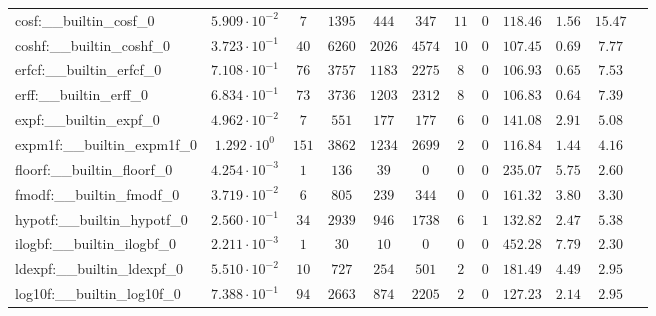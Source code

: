 \begin{tabular}{|l|c|c|c|c|c|c|c|c|c|c|c|}
cosf:\_\_builtin\_cosf\_0                 & $ 5.909 \cdot 10^{-2} $ & $ 7      $ & $ 1395   $ & $ 444   $ & $ 347   $ & $ 11  $ & $ 0 $ & $ 118.46      $ & $ 1.56    $ & $ 15.47   $ \\
coshf:\_\_builtin\_coshf\_0               & $ 3.723 \cdot 10^{-1} $ & $ 40     $ & $ 6260   $ & $ 2026  $ & $ 4574  $ & $ 10  $ & $ 0 $ & $ 107.45      $ & $ 0.69    $ & $ 7.77    $ \\
erfcf:\_\_builtin\_erfcf\_0               & $ 7.108 \cdot 10^{-1} $ & $ 76     $ & $ 3757   $ & $ 1183  $ & $ 2275  $ & $ 8   $ & $ 0 $ & $ 106.93      $ & $ 0.65    $ & $ 7.53    $ \\
erff:\_\_builtin\_erff\_0                 & $ 6.834 \cdot 10^{-1} $ & $ 73     $ & $ 3736   $ & $ 1203  $ & $ 2312  $ & $ 8   $ & $ 0 $ & $ 106.83      $ & $ 0.64    $ & $ 7.39    $ \\
expf:\_\_builtin\_expf\_0                 & $ 4.962 \cdot 10^{-2} $ & $ 7      $ & $ 551    $ & $ 177   $ & $ 177   $ & $ 6   $ & $ 0 $ & $ 141.08      $ & $ 2.91    $ & $ 5.08    $ \\
expm1f:\_\_builtin\_expm1f\_0             & $ 1.292 \cdot 10^{0}  $ & $ 151    $ & $ 3862   $ & $ 1234  $ & $ 2699  $ & $ 2   $ & $ 0 $ & $ 116.84      $ & $ 1.44    $ & $ 4.16    $ \\
floorf:\_\_builtin\_floorf\_0             & $ 4.254 \cdot 10^{-3} $ & $ 1      $ & $ 136    $ & $ 39    $ & $ 0     $ & $ 0   $ & $ 0 $ & $ 235.07      $ & $ 5.75    $ & $ 2.60    $ \\
fmodf:\_\_builtin\_fmodf\_0               & $ 3.719 \cdot 10^{-2} $ & $ 6      $ & $ 805    $ & $ 239   $ & $ 344   $ & $ 0   $ & $ 0 $ & $ 161.32      $ & $ 3.80    $ & $ 3.30    $ \\
hypotf:\_\_builtin\_hypotf\_0             & $ 2.560 \cdot 10^{-1} $ & $ 34     $ & $ 2939   $ & $ 946   $ & $ 1738  $ & $ 6   $ & $ 1 $ & $ 132.82      $ & $ 2.47    $ & $ 5.38    $ \\
ilogbf:\_\_builtin\_ilogbf\_0             & $ 2.211 \cdot 10^{-3} $ & $ 1      $ & $ 30     $ & $ 10    $ & $ 0     $ & $ 0   $ & $ 0 $ & $ 452.28      $ & $ 7.79    $ & $ 2.30    $ \\
ldexpf:\_\_builtin\_ldexpf\_0             & $ 5.510 \cdot 10^{-2} $ & $ 10     $ & $ 727    $ & $ 254   $ & $ 501   $ & $ 2   $ & $ 0 $ & $ 181.49      $ & $ 4.49    $ & $ 2.95    $ \\
log10f:\_\_builtin\_log10f\_0             & $ 7.388 \cdot 10^{-1} $ & $ 94     $ & $ 2663   $ & $ 874   $ & $ 2205  $ & $ 2   $ & $ 0 $ & $ 127.23      $ & $ 2.14    $ & $ 2.95    $ \\

\end{tabular}
